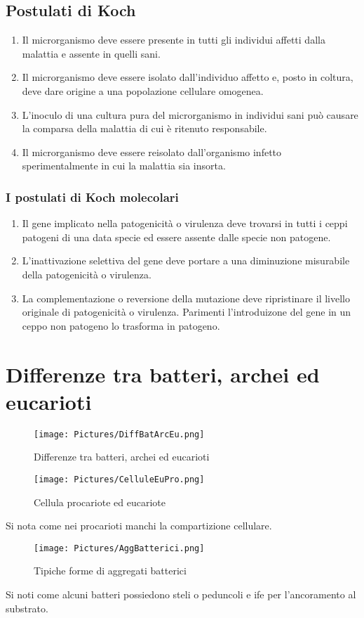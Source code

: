 \subsection{Postulati di Koch}
\begin{enumerate}
\item Il microrganismo deve essere presente in tutti gli individui affetti dalla malattia e assente in quelli sani.
\item Il microrganismo deve essere isolato dall'individuo affetto e, posto in coltura, deve dare origine a una popolazione cellulare omogenea.
\item L'inoculo di una cultura pura del microrganismo in individui sani pu\`o causare la comparsa della malattia di cui \`e ritenuto responsabile. 
\item Il microrganismo deve essere reisolato dall'organismo infetto sperimentalmente in cui la malattia sia insorta.
\end{enumerate}
\subsubsection{I postulati di Koch molecolari}
\begin{enumerate}
\item Il gene implicato nella patogenicit\`a o virulenza deve trovarsi in tutti i ceppi patogeni di una data specie ed essere assente dalle specie non 
patogene.
\item L'inattivazione selettiva del gene deve portare a una diminuzione misurabile della patogenicit\`a o virulenza.
\item La complementazione o reversione della mutazione deve ripristinare il livello originale di patogenicit\`a o virulenza. Parimenti l'introduizone del
gene in un ceppo non patogeno lo trasforma in patogeno.
\end{enumerate}
\section{Differenze tra batteri, archei ed eucarioti}
\begin{figure}[H]
\texttt{[image: Pictures/DiffBatArcEu.png]}
\caption{Differenze tra batteri, archei ed eucarioti}
\end{figure}
\newpage
\begin{multicols}{2}
\begin{figure}[H]
\texttt{[image: Pictures/CelluleEuPro.png]}
\caption{Cellula procariote ed eucariote}
\end{figure}
Si nota come nei procarioti manchi la compartizione cellulare. 
\columnbreak
\begin{figure}[H]
\texttt{[image: Pictures/AggBatterici.png]}
\caption{Tipiche forme di aggregati batterici}
\end{figure}
Si noti come alcuni batteri possiedono steli o peduncoli e ife per l'ancoramento al substrato.
\end{multicols}
